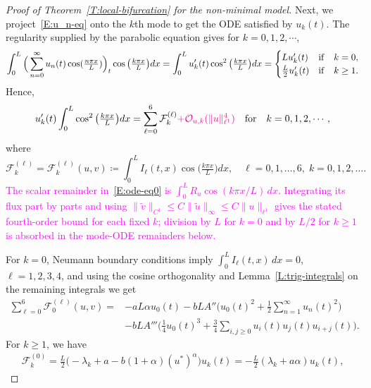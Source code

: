 \documentclass[11pt]{article} %
\theoremstyle{remark}
\theoremstyle{remark}
\numberwithin{equation}{section}
\numberwithin{figure}{section}
\numberwithin{table}{section}
\begin{document}
\begin{proof}[Proof of Theorem~\ref{T:local-bifurcation}  for the non-minimal model]
  Next, we project~\eqref{E:u_n-eq} onto the $k$th mode to get the ODE
  satisfied by $u_k(t)$. The regularity supplied by the parabolic equation gives
  for $k = 0, 1, 2, \cdots$,
  \begin{gather*}
    \int_0^{{L}}   \Big(\sum_{n=0}^\infty u_n(t)\cos(\tfrac{n\pi x}{L})\Big)_t   \cos\big(\tfrac{k\pi x}{L}\big)dx= \int_0^L u_k'(t)
    \cos^2\big(\tfrac{k\pi x}{L}\big)dx =
    \begin{cases}
      L u_k'(t)            & {\rm if}\quad k=0, \\
      \tfrac{L}{2} u_k'(t) & {\rm if}\quad k\ge 1.
    \end{cases}
  \end{gather*}
  Hence,
  \begin{equation}\label{E:ode-eq0}
    u'_k(t)\int_0^L \cos^2\big(\tfrac{k\pi x}{L}\big)dx=\sum_{\ell=0}^6
    \mathcal{F}_k^{(\ell)} \textcolor{magenta}{+\mathcal{O}_{u,k}(\|u\|_{\ell^1}^4)}\quad {\rm for}\quad k=0,1,2,\cdots,
  \end{equation}
  where
  \begin{equation}\label{E:Fk-projection}
    \mathcal{F}_k^{(\ell)} = \mathcal{F}_k^{(\ell)}(u,v) \coloneqq \int_0^L
    I_{\ell}(t,x) \cos\big(\tfrac{k\pi x}{L}\big) dx, \quad \ell =
    0,1,\ldots,6,\; k = 0,1,2,\dots.
  \end{equation}
  \textcolor{magenta}{The scalar remainder in~\eqref{E:ode-eq0} is $\int_0^L R_u\cos(k\pi x/L)\,dx$.
  Integrating its flux part by parts and using $\|\tilde{v}\|_{C^1}\le C\|\tilde{u}\|_\infty\le C\|u\|_{\ell^1}$ gives the stated fourth-order bound for each fixed $k$; division by $L$ for $k=0$ and by $L/2$ for $k\ge1$ is absorbed in the mode-ODE remainders below.}

  For $k = 0$, Neumann boundary conditions imply $\int_0^L I_\ell(t, x)\,dx =
  0$, $\ell = 1, 2, 3, 4$, and using the cosine orthogonality and
  Lemma~\ref{L:trig-integrals} on the remaining integrals we get
  \begin{align*}
    \sum_{\ell=0}^{6} \mathcal{F}_0^{(\ell)}(u,v)
    =      & {-aL\alpha u_0(t)}
    - b L A''
    \Big(
    u_0(t)^2 + \frac{1}{2}\sum_{n=1}^\infty u_n(t)^2
    \Big) \\
    & - b L A'''
    \Big(
    \frac{1}{4}u_0(t)^3
    + \frac{3}{4}\sum_{i,j\ge0} u_i(t)u_j(t)u_{i+j}(t)
    \Big).
  \end{align*}
  For $k \ge 1$, we have
  \begin{align*}
    \mathcal{F}_k^{(0)}
    =
    \frac{L}{2}\Big(-\lambda_k + a - b(1+\alpha)(u^*)^\alpha\Big)
    u_k(t){=-{\frac{L}{2}}(\lambda_k+a\alpha)u_k(t),}
  \end{align*}


\end{proof}
\end{document}
